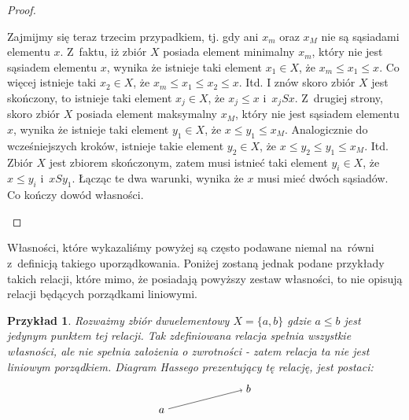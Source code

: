 \documentclass[12pt,a4paper]{report}
\newtheorem{example}{Przykład}
\begin{document}
\begin{proof}
\begin{enumerate}
\begin{itemize}
Zajmijmy się teraz trzecim przypadkiem, tj. gdy ani $x_m$ oraz $x_M$ nie są sąsiadami elementu $x$. Z~faktu, iż zbiór $X$ posiada element minimalny $x_m$, który nie jest sąsiadem elementu $x$, wynika że istnieje taki element $x_1 \in X$, że $x_m \leq x_1 \leq x$. Co więcej istnieje taki $x_2 \in X$, że $x_m \leq x_1 \leq x_2 \leq x.$ Itd. I znów skoro zbiór $X$ jest skończony, to istnieje taki element $x_j \in X$, że $x_j \leq x$ i~$x_jSx$. Z~drugiej strony, skoro zbiór $X$ posiada element maksymalny $x_M$, który nie jest sąsiadem elementu $x$, wynika że istnieje taki element $y_1 \in X$, że $x \leq y_1 \leq x_M$. Analogicznie do wcześniejszych kroków, istnieje takie element $y_2 \in X$, że $x \leq y_2 \leq y_1 \leq x_M$. Itd.  Zbiór $X$ jest zbiorem skończonym, zatem musi istnieć taki element $y_i \in X$, że $x \leq y_i$ i~$xSy_1$. 
Łącząc te dwa warunki, wynika że $x$ musi mieć dwóch sąsiadów. Co kończy dowód własności.

\end{itemize}

\end{enumerate}
\end{proof}

Własności, które wykazaliśmy powyżej są często podawane niemal na~równi z~definicją takiego uporządkowania. Poniżej zostaną jednak podane przykłady takich relacji, które mimo, że posiadają powyższy zestaw własności, to nie opisują relacji będących porządkami liniowymi. 
 
\begin{example}
Rozważmy zbiór dwuelementowy $X = \{ a, b \}$ gdzie $a \leq b$ jest jedynym punktem tej relacji. Tak zdefiniowana relacja spełnia wszystkie własności, ale nie spełnia założenia o zwrotności - zatem relacja ta nie jest liniowym porządkiem. Diagram Hassego prezentujący tę relację, jest postaci: 
$$
\begin{tikzpicture}[scale=.7]
  \node (a) at (-2,0) {$a$};
  \node (b) at (2,1) {$b$};
  \draw [->](a)--(b) ;
\end{tikzpicture}
$$
\end{example}
\end{document}
